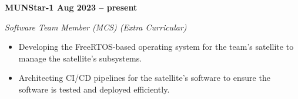 \vspace{0.1cm}
\textbf{MUNStar-1 \hfill Aug 2023 -- present} \par
\textit{Software Team Member (MCS) (Extra Curricular)} \par
\begin{itemize}
    \item Developing the FreeRTOS-based operating system for the team's satellite to manage the satellite's subsystems.
    \item Architecting CI/CD pipelines for the satellite's software to ensure the software is tested and deployed efficiently.
\end{itemize} \par